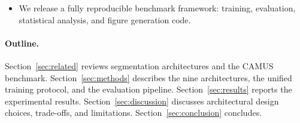 \begin{itemize}[leftmargin=*,nosep]
\item We release a fully reproducible benchmark framework: training,
      evaluation, statistical analysis, and figure generation code.
\end{itemize}

\paragraph{Outline.}
Section~\ref{sec:related} reviews segmentation architectures and the
CAMUS benchmark. Section~\ref{sec:methods} describes the nine
architectures, the unified training protocol, and the evaluation
pipeline. Section~\ref{sec:results} reports the experimental results.
Section~\ref{sec:discussion} discusses architectural design choices,
trade-offs, and limitations. Section~\ref{sec:conclusion} concludes.
